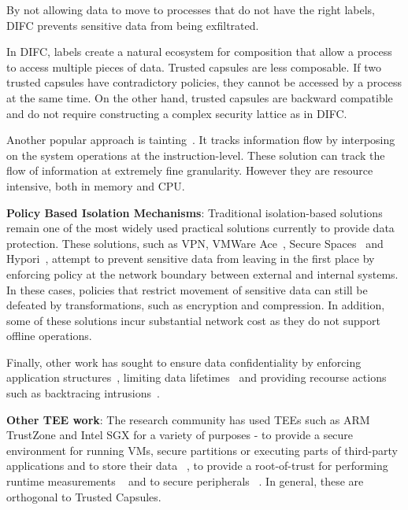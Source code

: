 By not allowing data to move to processes that 
do not have the right labels, DIFC prevents sensitive data from being exfiltrated. 
 
In DIFC, labels create a natural ecosystem for composition that allow a process to access multiple pieces of data. Trusted capsules are less composable. 
If two trusted capsules have contradictory policies, they
cannot be accessed by a process at the same time. On the other hand, trusted capsules are backward compatible 
and do not require constructing a complex security lattice as in DIFC.

Another popular approach is tainting~\cite{demandemulation, neon,
taintdroid, practicaltainting}. It tracks information flow by interposing
on the system operations at the instruction-level. 
These solution can track the flow of information at extremely fine
granularity. %
However they are resource intensive, both in memory
and CPU. 

\textbf{Policy Based Isolation Mechanisms}: Traditional isolation-based solutions remain one of the most widely used practical solutions currently to provide data protection. These solutions, such as VPN, VMWare Ace~\cite{VMWareAce}, Secure Spaces~\cite{securespaces} and Hypori~\cite{hypori}, attempt to prevent
sensitive data from leaving in the first place by enforcing policy at
the network boundary between external and internal systems. 
In these cases, policies that restrict movement of sensitive data can still be
defeated by transformations, such as encryption and compression.
In addition, some of these solutions incur substantial network cost as they do not support offline operations. 

Finally, other work has sought to ensure data confidentiality by
enforcing application structures~\cite{Cleanroom, privacycapsules},
limiting data lifetimes~\cite{enforcinglifetime, lacuna} and providing
recourse actions such as backtracing intrusions~\cite{Backtracking, taser}.


\textbf{Other TEE work}: The research community has used TEEs such as ARM
TrustZone and Intel SGX for a variety of purposes - to provide a secure environment for running VMs, secure partitions or executing parts of third-party applications and to store their data   ~\cite{TLR, Nokia1, Nokia2}, to provide a root-of-trust for performing runtime measurements ~\cite{restrictedspaces, hypervision,SKEE,secvisor} and to secure peripherals ~\cite{TrustedSensors}. In general, these are
orthogonal to Trusted Capsules. 


